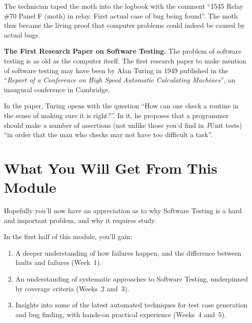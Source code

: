 The technician taped the moth into the logbook with the comment ``1545 Relay
\#70 Panel F (moth) in relay. First actual case of bug being found''. The moth
thus became the living proof that computer problems could indeed be caused by
actual bugs.



{\bf The First Research Paper on Software Testing.}
%
The problem of software testing is as old as the computer itself. The first
research paper to make mention of software testing may have been by Alan Turing
in 1949 published in the ``{\it Report of a Conference on High Speed Automatic
Calculating Machines}'', an inaugural conference in Cambridge.

In the paper, Turing opens with the question ``How can one check a routine in
the sense of making sure it is right?''. In it, he proposes that a programmer
should make a number of assertions (not unlike those you'd find in JUnit tests)
``in order that the man who checks may not have too difficult a task''.




\section{What You Will Get From This Module}

Hopefully you'll now have an appreciation as to why Software Testing is a hard
and important problem, and why it requires study.


In the first half of this module, you'll gain:

\begin{enumerate}

    \item A deeper understanding of how failures happen, and the difference
    between faults and failures (Week~1).

    \item An understanding of systematic approaches to Software Testing,
    underpinned by coverage criteria (Weeks~2 and~3).

    \item Insights into some of the latest automated techniques for test case
    generation and bug finding, with hands-on practical experience (Weeks~4 and~5).

\end{enumerate}


